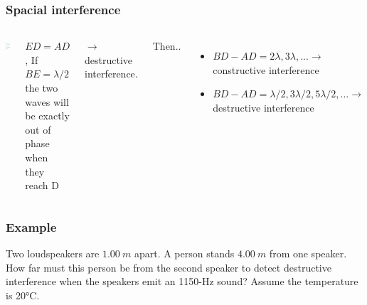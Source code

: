 \documentclass[]{beamer}
\begin{document}
\begin{frame}
\frametitle{Spacial interference}


  \begin{columns}[c]
   \column{2in}  %
  
  \begin{center}
  \includegraphics[height=2.in]{images4/soundinterference2.jpg}
\end{center}


   \column{2in}
\pause

  $ED=AD$,  If  $BE=\lambda/2$  the two waves will be exactly out of
phase when they reach D
\pause
\vspace{3mm}

 $\rightarrow$ destructive interference.

\pause
Then..

\begin{itemize}
\item $BD-AD=2\lambda, 3\lambda,...\rightarrow$ constructive interference
\pause

\item $BD-AD=\lambda/2, 3\lambda/2, 5\lambda/2,...\rightarrow$ destructive interference
\end{itemize}


   \end{columns}
  \end{frame}


\begin{frame}
\frametitle{Example}

Two loudspeakers are $1.00~m$
apart. A person stands $4.00~m$ from one speaker. How far must this person be
from the second speaker to detect destructive interference when the speakers
emit an 1150-Hz sound? Assume the temperature is 20°C.

  \end{frame}
\end{document}
